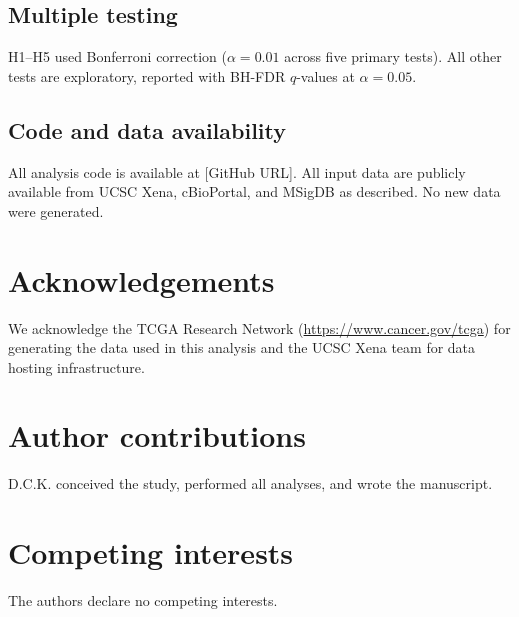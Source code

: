 \documentclass[10pt,twocolumn]{article}
\begin{document}
\subsection{Multiple testing}
H1--H5 used Bonferroni correction ($\alpha=0.01$ across five primary
tests). All other tests are exploratory, reported with BH-FDR
$q$-values at $\alpha=0.05$.

\subsection{Code and data availability}
All analysis code is available at [GitHub URL]. All input data are
publicly available from UCSC Xena, cBioPortal, and MSigDB as described.
No new data were generated.

\section*{Acknowledgements}
We acknowledge the TCGA Research Network
(\url{https://www.cancer.gov/tcga}) for generating the data used in
this analysis and the UCSC Xena team for data hosting infrastructure.

\section*{Author contributions}
D.C.K. conceived the study, performed all analyses, and wrote the
manuscript.

\section*{Competing interests}
The authors declare no competing interests.
\end{document}
